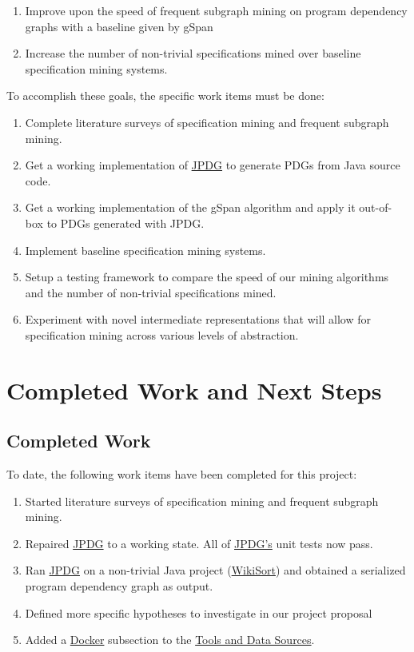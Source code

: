 \documentclass[12pt]{article}
\begin{document}
\begin{enumerate}
    \item Improve upon the speed of frequent subgraph mining on program dependency graphs with a baseline given by gSpan
    \item Increase the number of non-trivial specifications mined over baseline specification mining systems.
\end{enumerate}

\noindent To accomplish these goals, the specific work items must be done:

\begin{enumerate}
    \item Complete literature surveys of specification mining and frequent subgraph mining.
    \item Get a working implementation of \hyperref[subsection:JPDG]{JPDG} to generate PDGs from Java source code.
    \item Get a working implementation of the gSpan algorithm and apply it out-of-box to PDGs generated with JPDG.
    \item Implement baseline specification mining systems.
    \item Setup a testing framework to compare the speed of our mining algorithms and the number of non-trivial specifications mined.
    \item Experiment with novel intermediate representations that will allow for specification mining across various levels of abstraction.
\end{enumerate}

\section{Completed Work and Next Steps}

\subsection{Completed Work}
To date, the following work items have been completed for this project:

\begin{enumerate}
    \item Started literature surveys of specification mining and frequent subgraph mining.
    \item Repaired \hyperref[subsection:JPDG]{JPDG} to a working state. All of \hyperref[subsection:JPDG]{JPDG's} unit tests now pass.
    \item Ran \hyperref[subsection:JPDG]{JPDG} on a non-trivial Java project (\href{https://github.com/BonzaiThePenguin/WikiSort}{WikiSort}) and obtained a serialized program dependency graph as output.
    \item Defined more specific hypotheses to investigate in our project proposal
    \item Added a \hyperref[subsection:Docker]{Docker} subsection to the \hyperref[section:Tools and Data Sources]{Tools and Data Sources}.
\end{enumerate}
\end{document}
